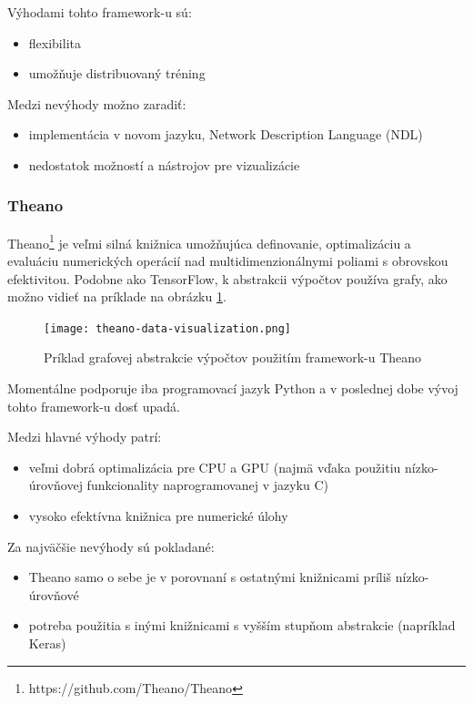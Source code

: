 Výhodami tohto framework-u sú:
\begin{itemize}
	\item flexibilita
	\item umožňuje distribuovaný tréning
\end{itemize}

Medzi nevýhody možno zaradiť:
\begin{itemize}
	\item implementácia v novom jazyku, Network Description Language (NDL)
	\item nedostatok možností a nástrojov pre vizualizácie
\end{itemize}

\subsubsection{Theano}

Theano\footnote{https://github.com/Theano/Theano} je veľmi silná knižnica umožňujúca definovanie, optimalizáciu a evaluáciu numerických operácií nad multidimenzionálnymi poliami s obrovskou efektivitou. Podobne ako TensorFlow, k abstrakcii výpočtov používa grafy, ako možno vidieť na príklade na obrázku \ref{theano_image}.


\begin{figure}[H]
	\begin{center}\texttt{[image: theano-data-visualization.png]}
		\caption[Príklad grafovej abstrakcie výpočtov použitím framework-u Theano]{
			Príklad grafovej abstrakcie výpočtov použitím framework-u Theano\footnotemark
		}\label{theano_image}
	\end{center}
\end{figure}

Momentálne podporuje iba programovací jazyk Python a v poslednej dobe vývoj tohto framework-u dosť upadá.

Medzi hlavné výhody patrí:
\begin{itemize}
	\item veľmi dobrá optimalizácia pre CPU a GPU (najmä vďaka použitiu nízko-úrovňovej funkcionality naprogramovanej v jazyku C)
	\item vysoko efektívna knižnica pre numerické úlohy
\end{itemize}

Za najväčšie nevýhody sú pokladané:
\begin{itemize}
	\item Theano samo o sebe je v porovnaní s ostatnými knižnicami príliš nízko-úrovňové
	\item potreba použitia s inými knižnicami s vyšším stupňom abstrakcie (napríklad Keras) 
\end{itemize}

